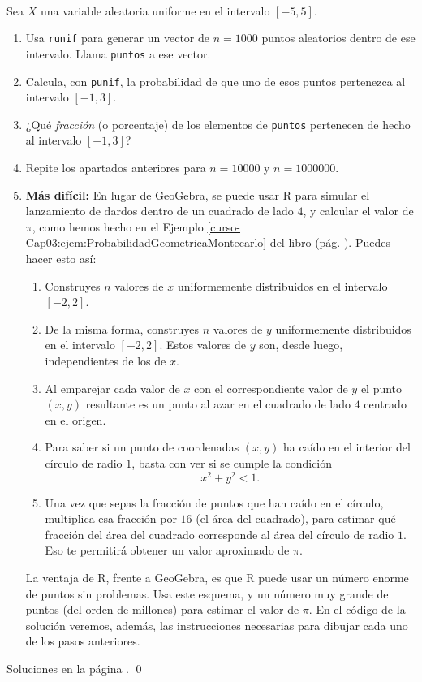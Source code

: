 \documentclass[10pt,a4paper]{article}\usepackage[]{graphicx}\usepackage[]{color}
\begin{document}
\begin{ejercicio}
\label{tut05:ejercicio20}
\quad\\
Sea $X$ una variable aleatoria uniforme en el intervalo $[-5, 5]$.
\begin{enumerate}
  \item Usa {\tt runif} para generar un vector de $n=1000$ puntos aleatorios dentro de ese intervalo. Llama {\tt puntos} a ese vector.
  \item Calcula, con {\tt punif}, la probabilidad de que uno de esos puntos pertenezca al intervalo $[-1, 3]$.
  \item ¿Qué {\em fracción} (o porcentaje) de los elementos de {\tt puntos} pertenecen de hecho al intervalo $[-1, 3]$?
  \item Repite los apartados anteriores para $n = 10000$ y $n = 1000000$.
  \item {\bf Más difícil:} En lugar de GeoGebra, se puede usar R para simular el lanzamiento de dardos dentro de un cuadrado de lado $4$, y calcular el valor de $\pi$, como hemos hecho en el Ejemplo \ref{curso-Cap03:ejem:ProbabilidadGeometricaMontecarlo} del libro (pág. \pageref{curso-Cap03:ejem:ProbabilidadGeometricaMontecarlo}). Puedes hacer esto así:
      \begin{enumerate}
        \item Construyes $n$ valores de $x$ uniformemente distribuidos en el intervalo $[-2, 2]$.
        \item De la misma forma, construyes $n$ valores de $y$ uniformemente distribuidos en el intervalo $[-2, 2]$. Estos valores de $y$ son, desde luego, independientes de los de $x$.
        \item Al emparejar cada  valor de  $x$ con el correspondiente valor de $y$ el punto $(x, y)$ resultante es un punto al azar en el cuadrado de lado $4$ centrado en el origen.
        \item Para saber si un punto de coordenadas $(x,y)$ ha caído en el interior del círculo de radio $1$, basta con ver si se cumple la condición
        \[x^2 + y^2 < 1.\]
        \item Una vez que sepas la fracción de puntos que han caído en el círculo, multiplica esa fracción por $16$ (el área del cuadrado), para estimar qué fracción del área del cuadrado corresponde al área del círculo de radio $1$. Eso te permitirá obtener un valor aproximado de $\pi$.
      \end{enumerate}
      La ventaja de R, frente a GeoGebra, es que R puede usar un número enorme de puntos sin problemas. Usa este esquema, y un número muy grande de puntos (del orden de millones) para estimar el valor de $\pi$. En el código de la solución veremos, además, las instrucciones necesarias para dibujar cada uno de los pasos anteriores.
\end{enumerate}
Soluciones en la página \pageref{tut05:ejercicio20:sol}.
\qed
\end{ejercicio}
\end{document}
